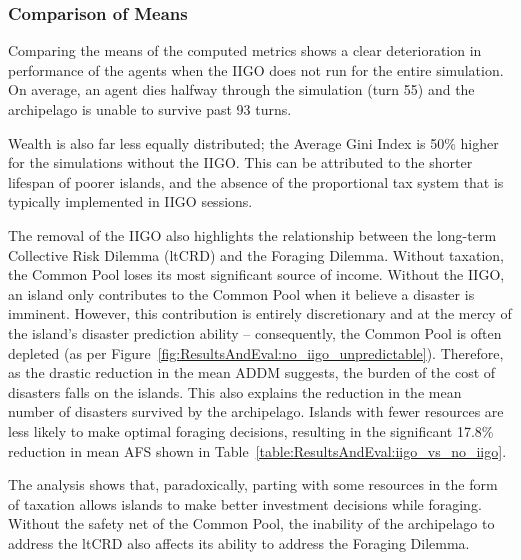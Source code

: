 \subsubsection{Comparison of Means}
\label{subsec:ResultsAndEval:no-iigo:comparison_of_means}
Comparing the means of the computed metrics shows a clear deterioration in performance of the agents when the IIGO does not run for the entire simulation. 
On average, an agent dies halfway through the simulation (turn 55) and the archipelago is unable to survive past 93 turns. 

Wealth is also far less equally distributed; the Average Gini Index is 50\% higher for the simulations without the IIGO. This can be attributed to the shorter lifespan of poorer islands, and the absence of the proportional tax system that is typically implemented in IIGO sessions. 

The removal of the IIGO also highlights the relationship between the long-term Collective Risk Dilemma (ltCRD) and the Foraging Dilemma. Without taxation, the Common Pool loses its most significant source of income. 
Without the IIGO, an island only contributes to the Common Pool when it believe a disaster is imminent. However, this contribution is entirely discretionary and at the mercy of the island's disaster prediction ability -- consequently, the Common Pool is often depleted (as per Figure~\ref{fig:ResultsAndEval:no_iigo_unpredictable}). 
Therefore, as the drastic reduction in the mean ADDM suggests, the burden of the cost of disasters falls on the islands. This also explains the reduction in the mean number of disasters survived by the archipelago. Islands with fewer resources are less likely to make optimal foraging decisions, resulting in the significant 17.8\% reduction in mean AFS shown in Table~\ref{table:ResultsAndEval:iigo_vs_no_iigo}.

The analysis shows that, paradoxically, parting with some resources in the form of taxation allows islands to make better investment decisions while foraging. Without the safety net of the Common Pool, the inability of the archipelago to address the ltCRD also affects its ability to address the Foraging Dilemma.


